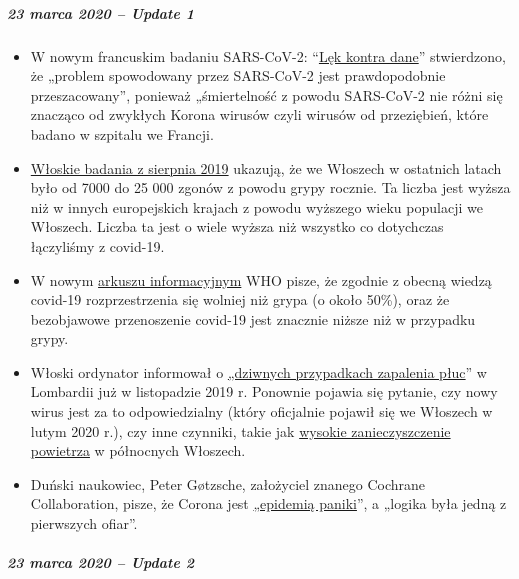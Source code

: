 \hypertarget{23-marca-2020--update-1}{%
\subparagraph{\texorpdfstring{\textbf{23 marca 2020 -- Update
1}}{23 marca 2020 -- Update 1}}\label{23-marca-2020--update-1}}

\begin{itemize}
\tightlist
\item
  W nowym francuskim badaniu SARS-CoV-2:
  ``\href{https://www.sciencedirect.com/science/article/abs/pii/S0924857920300972}{Lęk
  kontra dane}'' stwierdzono, że „problem spowodowany przez SARS-CoV-2
  jest prawdopodobnie przeszacowany'', ponieważ „śmiertelność z powodu
  SARS-CoV-2 nie różni się znacząco od zwykłych Korona wirusów czyli
  wirusów od przeziębień, które badano w szpitalu we Francji.
\item
  \href{https://www.ijidonline.com/article/S1201-9712(19)30328-5/fulltext}{Włoskie
  badania z sierpnia 2019} ukazują, że we Włoszech w ostatnich latach
  było od 7000 do 25 000 zgonów z powodu grypy rocznie. Ta liczba jest
  wyższa niż w innych europejskich krajach z powodu wyższego wieku
  populacji we Włoszech. Liczba ta jest o wiele wyższa niż wszystko co
  dotychczas łączyliśmy z covid-19.
\item
  W nowym
  \href{https://www.who.int/news-room/q-a-detail/q-a-similarities-and-differences-covid-19-and-influenza}{arkuszu
  informacyjnym} WHO pisze, że zgodnie z obecną wiedzą covid-19
  rozprzestrzenia się wolniej niż grypa (o około 50\%), oraz że
  bezobjawowe przenoszenie covid-19 jest znacznie niższe niż w przypadku
  grypy.
\item
  Włoski ordynator informował o
  \href{https://www.scmp.com/news/china/society/article/3076334/coronavirus-strange-pneumonia-seen-lombardy-november-leading}{„dziwnych
  przypadkach zapalenia płuc}'' w Lombardii już w listopadzie 2019 r.
  Ponownie pojawia się pytanie, czy nowy wirus jest za to odpowiedzialny
  (który oficjalnie pojawił się we Włoszech w lutym 2020 r.), czy inne
  czynniki, takie jak
  \href{https://www.thelocal.it/20170131/our-lungs-are-breaking-smog-levels-way-above-safe-limits-in-northern-italy}{wysokie
  zanieczyszczenie powietrza} w północnych Włoszech.
\item
  Duński naukowiec, Peter Gøtzsche, założyciel znanego Cochrane
  Collaboration, pisze, że Corona jest
  \href{https://www.deadlymedicines.dk/corona-an-epidemic-of-mass-panic/}{„epidemią
  paniki}'', a „logika była jedną z pierwszych ofiar''.
\end{itemize}

\hypertarget{23-marca-2020--update-2}{%
\subparagraph{\texorpdfstring{\textbf{23 marca 2020 -- Update
2}}{23 marca 2020 -- Update 2}}\label{23-marca-2020--update-2}}

